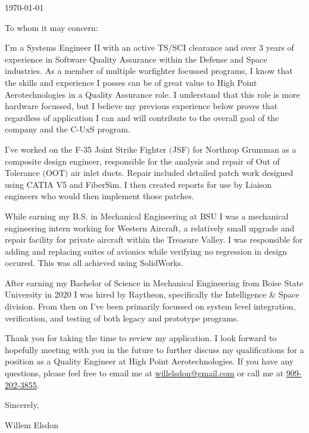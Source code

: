 \documentclass{ExpressiveCoverLetter}
\begin{document}
\coverletterheader[
    firstname=Willem,
    middleinitial=N,
    lastname=Elsdon,
    email=willelsdon@gmail.com,
    phone=909-202-3855,
    city=Boise,
    state=Idaho
]

\vspace{0.15in}
\today
\vspace{0.15in}


To whom it may concern:

I'm a Systems Engineer II with an active TS/SCI clearance and over 3 years of experience in Software
Quality Assurance within the Defense and Space industries. As a member
of multiple warfighter focussed programs, I know that
the skills and experience I posses can be of great value to High Point
Aerotechnologies in a Quality Assurance role. I understand that this
role is more hardware focussed, but I believe my previous experience
below proves that regardless of application I can and will contribute to
the overall goal of the company and the C-UxS program.

I've worked on the F-35 Joint Strike Fighter $($JSF$)$ for Northrop
Grumman as a composite design engineer, responsible for the analysis and
repair of
Out of Tolerance $($OOT$)$ air inlet ducts. Repair included detailed
patch work designed using CATIA V5 and FiberSim. I then created reports
for use by Liaison engineers who would then implement those patches.

While earning my B.S. in Mechanical Engineering at BSU I was a mechanical engineering intern working for
Western Aircraft, a relatively small upgrade and repair facility for
private aircraft within the Treasure Valley. I was responsible for
adding and replacing suites of avionics while verifying no regression in
design occured. This was all achieved using SolidWorks.

After earning my Bachelor of Science in Mechanical Engineering from
Boise State University in 2020 I was hired by Raytheon, specifically the
Intelligence \& Space division. From then on I've been primarily focussed
on system level integration, verification, and testing of both legacy
and prototype programs.

Thank you for taking the time to review my application. I look forward
to hopefully meeting with you in the future to further discuss my
qualifications for a position as a Quality Engineer at High Point Aerotechnologies.
If you have any questions, please feel free to
email me at \href{mailto:willelsdon@gmail.com}{willelsdon@gmail.com} or
call me at \href{tel:+1-909-202-3855}{909-202-3855}.

Sincerely,

\vspace{.15in}

Willem Elsdon
\end{document}
